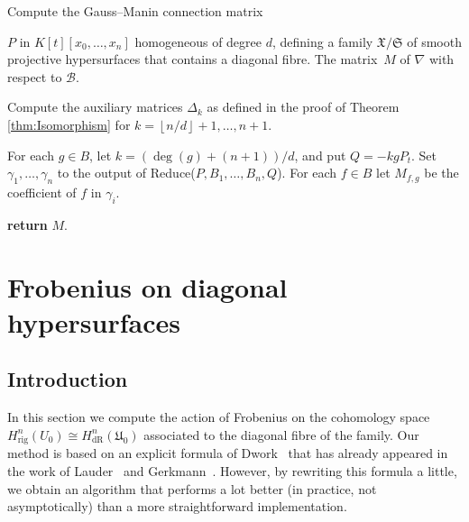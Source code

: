 \documentclass[a4paper,11pt]{article}
\numberwithin{equation}{section}
\providecommand{\floor}[1]{\left\lfloor#1\right\rfloor}   %
\providecommand{\HdR}{H_{\text{dR}}}    %
\providecommand{\Hrig}{H_{\text{rig}}}  %
\providecommand{\cB}{\mathcal{B}} %
\theoremstyle{definition}
\begin{document}
\begin{algorithm}
\caption{Compute the Gauss--Manin connection matrix}
\label{alg:Connection}
\begin{algorithmic}
\Require $P$ in $K[t][x_0, \dotsc, x_n]$ homogeneous of degree $d$, 
         defining a family $\mathfrak{X}/\mathfrak{S}$ of smooth projective 
         hypersurfaces that contains a diagonal fibre.
\Ensure  The matrix~$M$ of $\nabla$ with respect to $\cB$.
\State \begin{compactenum}[\it {Step} I.] \vspace{-1.24em}
\item Compute the auxiliary matrices $\Delta_k$  as defined 
      in the proof of Theorem \ref{thm:Isomorphism}
      for $k = \floor{n/d}+1, \dotsc, n+1$.
\item For each $g \in B$, let $k=(\deg(g)+(n+1))/d$, and put $Q = - k g P_t$. Set 
      $\gamma_{1}, \dotsc, \gamma_n$ to the output of {\sc Reduce($P, B_1, \dotsc, B_n, Q$)}.  
      For each $f \in B$ let $M_{f,g}$ be the coefficient of $f$ in $\gamma_i$.
\item \textbf{return} $M$.
\end{compactenum}
\EndProcedure
\end{algorithmic}
\end{algorithm}



\section{Frobenius on diagonal hypersurfaces}
\label{sec:Diagonal}

\subsection{Introduction}

In this section we compute the action of Frobenius on the cohomology 
space $\Hrig^{n}(U_0) \cong \HdR^{n}(\mathfrak{U}_0)$ associated 
to the diagonal fibre of the family. Our method is based on an 
explicit formula of Dwork~\citep[\S 4]{Dwork1964} that has already appeared
in the work of Lauder~\citep[\S 6]{Lauder2004b} and 
Gerkmann~\citep[\S 4.4]{Gerkmann2007}. However, by rewriting this formula 
a little, we obtain an algorithm that performs a lot better (in practice,
not asymptotically) than a more straightforward implementation.
\end{document}
